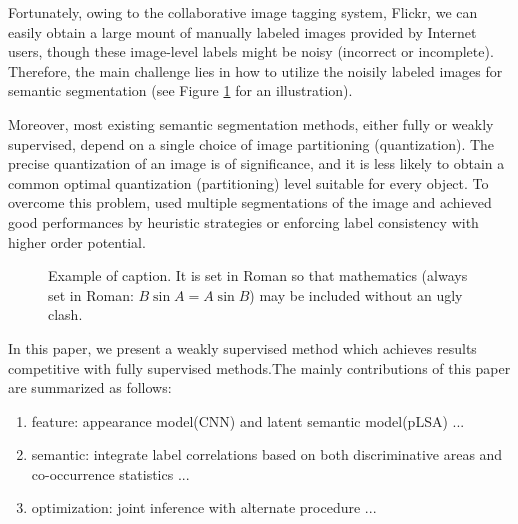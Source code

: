 \if
 Fortunately, owing to the collaborative image tagging system, \eg Flickr, we can easily obtain a large mount of manually labeled images provided by Internet users, though these image-level labels might be noisy (incorrect or incomplete). Therefore, the main challenge lies in how to utilize the noisily labeled images for semantic segmentation (see Figure \ref{fig:noisylabel} for an illustration).


 Moreover, most existing semantic segmentation methods, either fully or weakly supervised, depend on a single choice of image partitioning (quantization). The precise quantization of an image is of significance, and it is less likely to obtain a common optimal quantization (partitioning) level suitable for every object. To overcome this problem, \cite{hoiem2005geometric,kohli2009robust,ladicky2009associative,nowozin2010parameter,russell2006using} used multiple segmentations of the image and achieved good performances by heuristic strategies or enforcing label consistency with higher order potential.
\fi

\begin{figure}[t]
\begin{center}
\fbox{\rule{0pt}{2in} \rule{0.9\linewidth}{0pt}}
\end{center}
   \caption{Example of caption.  It is set in Roman so that mathematics
   (always set in Roman: $B \sin A = A \sin B$) may be included without an
   ugly clash.}
\label{fig:noisylabel}
\end{figure}

In this paper, we present a weakly supervised method which achieves results competitive with fully supervised methods.The mainly contributions of this paper are summarized as follows:
\begin{enumerate}
  \item feature: appearance model(CNN) and latent semantic model(pLSA) ...
  \item semantic: integrate label correlations based on both discriminative areas and co-occurrence statistics ...
  \item optimization: joint inference with alternate procedure ...
\end{enumerate}